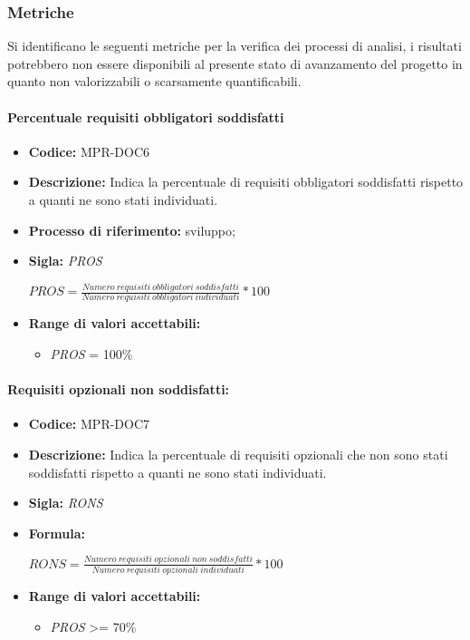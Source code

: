 \subsubsection{Metriche}

Si identificano le seguenti metriche per la verifica dei processi di analisi, i risultati potrebbero non essere disponibili al presente stato di avanzamento del progetto
in quanto non valorizzabili o scarsamente quantificabili.


\paragraph{Percentuale requisiti obbligatori soddisfatti}
    
 \begin{itemize}
    \item \textbf{Codice:} MPR-DOC6
    \item \textbf{Descrizione:} Indica la percentuale di requisiti obbligatori soddisfatti rispetto a quanti ne sono stati individuati.
    \item \textbf{Processo di riferimento:} sviluppo;
    \item \textbf{Sigla:} \textit{PROS}
  
    
    \begin{center}
        \(PROS = \frac{Numero\ requisiti\ obbligatori\ soddisfatti}{Numero\ requisiti\  obbligatori\ individuati}*100\)
    \end{center}

    \item \textbf{Range di valori accettabili:}
    \begin{itemize}
        \item  \textit{PROS} = 100\%
    \end{itemize}
\end{itemize}
    
  
\paragraph{Requisiti opzionali non soddisfatti:}
  \begin{itemize}
    \item \textbf{Codice:} MPR-DOC7
    \item \textbf{Descrizione:} Indica la percentuale di requisiti opzionali che non sono stati soddisfatti rispetto a quanti ne sono stati individuati.
    \item \textbf{Sigla:} \textit{RONS}
    \item \textbf{Formula:}
    \begin{center}
        \(RONS=\frac{Numero\ requisiti\ opzionali\ non\ soddisfatti}{Numero\ requisiti\  opzionali\ individuati}*100\)
    \end{center}
    \item \textbf{Range di valori accettabili:}
    \begin{itemize}
        \item \textit{PROS} >= 70\%
    
    \end{itemize}
\end{itemize}


